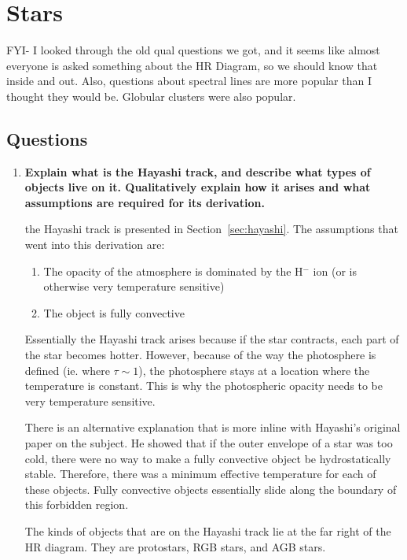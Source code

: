 \section{Stars}

FYI- I looked through the old qual questions we got, and it seems like almost everyone is asked 
something about the HR Diagram, so we should know that inside and out.  Also, questions about 
spectral lines are more popular than I thought they would be.  Globular clusters were also popular.

\subsection{Questions}\label{sec:stars_questions}
\begin{enumerate}
\item \textbf{Explain what is the Hayashi track, and describe what types of objects live on it.
      Qualitatively explain how it arises and what assumptions are required for its derivation.}

       the Hayashi track is presented in Section~\ref{sec:hayashi}.
      The assumptions that went into this derivation are:
      \begin{enumerate}
      \item The opacity of the atmosphere is dominated by the H$^-$ ion
            (or is otherwise very temperature sensitive)
      \item The object is fully convective
      \end{enumerate}
      Essentially the Hayashi track arises because if the star contracts, each part of the star
      becomes hotter.  However, because of the way the photosphere is defined (ie. where $\tau\sim1$),
      the photosphere stays at a location where the temperature is constant.  This is why the
      photospheric opacity needs to be very temperature sensitive.
      
      There is an alternative explanation that is more inline with Hayashi's original paper
      on the subject.  He showed that if the outer envelope of a star was too cold, there were
      no way to make a fully convective object be hydrostatically stable.  Therefore, there was
      a minimum effective temperature for each of these objects.  Fully convective objects
      essentially slide along the boundary of this forbidden region.

      The kinds of objects that are on the Hayashi track lie at the far right of the HR diagram.
      They are protostars, RGB stars, and AGB stars.


\end{enumerate}
